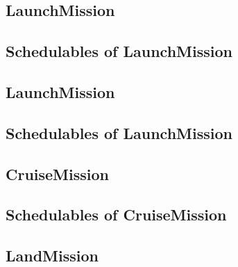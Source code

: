 \documentclass[10pt,a4paper]{article}
\begin{document}

\newpage


\newpage


\newpage


\subsection{LaunchMission}

\newpage

\subsection{Schedulables of LaunchMission}


\newpage


\subsection{LaunchMission}

\newpage

\subsection{Schedulables of LaunchMission}


\newpage


\subsection{CruiseMission}

\newpage

\subsection{Schedulables of CruiseMission}


\newpage


\newpage


\newpage


\subsection{LandMission}

\newpage
\end{document}

